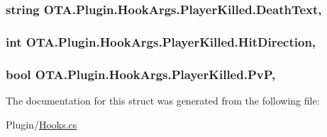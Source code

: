 \subsubsection[{Death\+Text}]{\setlength{\rightskip}{0pt plus 5cm}string O\+T\+A.\+Plugin.\+Hook\+Args.\+Player\+Killed.\+Death\+Text\hspace{0.3cm}{\ttfamily [get]}, {\ttfamily [set]}}\label{struct_o_t_a_1_1_plugin_1_1_hook_args_1_1_player_killed_afb0150ebc6f8dd1a9e1b029aa5c3bdd9}
\hypertarget{struct_o_t_a_1_1_plugin_1_1_hook_args_1_1_player_killed_a20eb1e7128ee61e5d283d7fe11035683}{}
\subsubsection[{Hit\+Direction}]{\setlength{\rightskip}{0pt plus 5cm}int O\+T\+A.\+Plugin.\+Hook\+Args.\+Player\+Killed.\+Hit\+Direction\hspace{0.3cm}{\ttfamily [get]}, {\ttfamily [set]}}\label{struct_o_t_a_1_1_plugin_1_1_hook_args_1_1_player_killed_a20eb1e7128ee61e5d283d7fe11035683}
\hypertarget{struct_o_t_a_1_1_plugin_1_1_hook_args_1_1_player_killed_a94a48678328eb9096998fc6149483627}{}
\subsubsection[{Pv\+P}]{\setlength{\rightskip}{0pt plus 5cm}bool O\+T\+A.\+Plugin.\+Hook\+Args.\+Player\+Killed.\+Pv\+P\hspace{0.3cm}{\ttfamily [get]}, {\ttfamily [set]}}\label{struct_o_t_a_1_1_plugin_1_1_hook_args_1_1_player_killed_a94a48678328eb9096998fc6149483627}


The documentation for this struct was generated from the following file\+:\begin{DoxyCompactItemize}
\item 
Plugin/\hyperlink{_hooks_8cs}{Hooks.\+cs}\end{DoxyCompactItemize}

